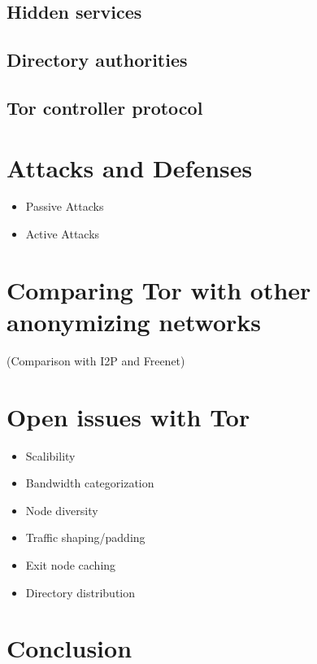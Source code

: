 \documentclass{llncs}
\begin{document}
\subsection{Hidden services}
\subsection{Directory authorities}
\subsection{Tor controller protocol}

\section{Attacks and Defenses} \label{tor_attack_defence}
\begin{itemize}
	\item{Passive Attacks}
	
	\item{Active Attacks}
\end{itemize}

\section{Comparing Tor with other anonymizing networks} \label{comparison}
(Comparison with I2P and Freenet)

\section{Open issues with Tor} \label{openissues}
\begin{itemize}
	\item{Scalibility}
	\item{Bandwidth categorization}
	\item{Node diversity}
	\item{Traffic shaping/padding}
	\item{Exit node caching}
	\item{Directory distribution}
\end{itemize}

\section{Conclusion} \label{conclusion}



\end{document}
